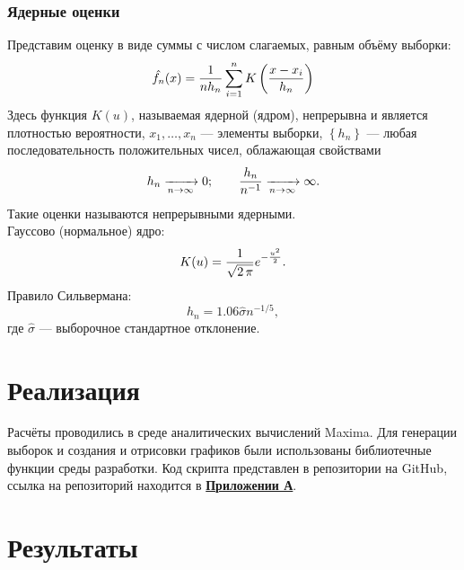 \documentclass[12pt]{article}
\begin{document}
\subsubsection{Ядерные оценки}
Представим оценку в виде суммы с числом слагаемых, равным объёму выборки:
\[
	\hat{f_n}(x) = \frac{1\mathstrut}{nh_n\mathstrut} \sum_{i=1}^{n}K\left(\frac{x-x_i\mathstrut}{h_n\mathstrut}\right)
\]
Здесь функция $K(u)$, называемая ядерной (ядром), непрерывна и является плотностью вероятности, $x_1, \dots, x_n$ --- элементы выборки, $\left\{h_n\right\}$ --- любая последовательность положительных чисел, облажающая свойствами
\[
	h_n \xrightarrow[n \to \infty]{} 0;\qquad \frac{h_n\mathstrut}{n^{-1}\mathstrut}\xrightarrow[n \to \infty]{} \infty.
\]
Такие оценки называются непрерывными ядерными.\\
Гауссово (нормальное) ядро:
\begin{equation}
	K(u) = \frac{1\mathstrut}{\sqrt{2\,\pi}\mathstrut}e^{-\frac{u^2\mathstrut}{2\mathstrut}}.
	\label{gaussian_kernel}
\end{equation}
Правило Сильвермана:
\begin{equation}
	h_n = 1.06\hat\sigma n^{-1/5},
	\label{silverman}
\end{equation}
где $\hat\sigma$ --- выборочное стандартное отклонение\cite{theory}.
\newpage
\section{Реализация}
Расчёты проводились в среде аналитических вычислений Maxima. Для генерации выборок и создания и отрисовки графиков были использованы библиотечные функции среды разработки. Код скрипта представлен в репозитории на GitHub, ссылка на репозиторий находится в \hyperlink{addition}{\textbf{Приложении А}}.
\newpage
\section{Результаты}
\end{document}
